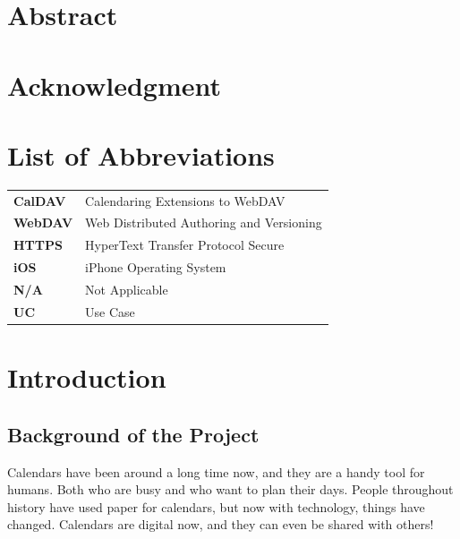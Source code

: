 \documentclass[12pt,a4paper]{report}
\begin{document}
\chapter*{Abstract}

\chapter*{Acknowledgment}
\newpage

\tableofcontents

\newpage
\listoffigures

\newpage
\listoftables
\newpage

\chapter*{List of Abbreviations}

\begin{tabular}{ll}
    \textbf{CalDAV} & Calendaring Extensions to WebDAV \\
    \textbf{WebDAV} & Web Distributed Authoring and Versioning \\
    \textbf{HTTPS} & HyperText Transfer Protocol Secure \\
    \textbf{iOS} & iPhone Operating System \\
    \textbf{N/A} & Not Applicable \\
    \textbf{UC} & Use Case
\end{tabular}


\chapter{Introduction}


\section{Background of the Project}

Calendars have been around a long time now, and they are a handy tool for humans. Both who are busy and who want to plan their days. People throughout history have used paper for calendars, but now with technology, things have changed. Calendars are digital now, and they can even be shared with others!
\end{document}
